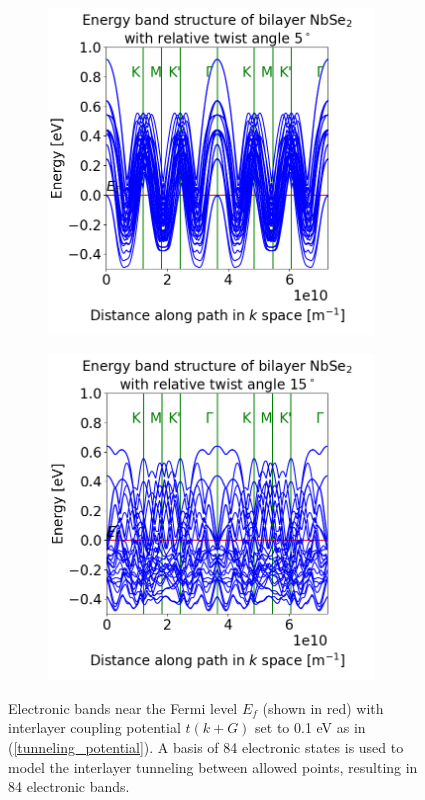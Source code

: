 \documentclass[12pt]{report} %
\begin{document}
\begin{figure}[t!]
\centering
  \begin{subfigure}[t]{0.475\textwidth}
    \centering
    \includegraphics[width=0.95\textwidth]{bilayer_bands_5_coupled.png}
    \caption{
    }
    \label{bilayer_bands_5_coupled}
  \end{subfigure}
  \hfill
  \begin{subfigure}[t]{0.475\textwidth}
    \centering
    \includegraphics[width=0.95\textwidth]{bilayer_bands_15_coupled.png}
    \caption{
    }
    \label{bilayer_bands_15_coupled}
  \end{subfigure}
  \caption{Electronic bands near the Fermi level $E_f$ (shown in red) with interlayer coupling potential $t(k+G)$ set to 0.1 eV as in (\ref{tunneling_potential}). A basis of 84 electronic states is used to model the interlayer tunneling between allowed points, resulting in 84 electronic bands.
  }
  \label{bilayer_bands_coupled}
\end{figure}
\end{document}
